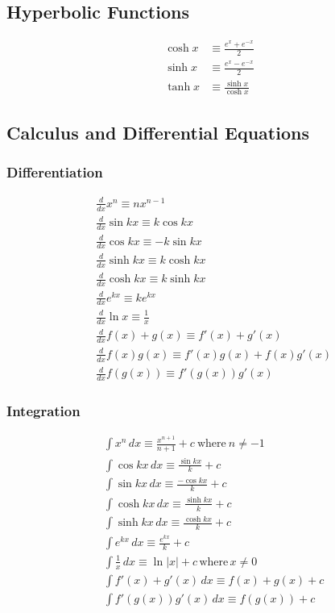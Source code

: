 \subsection{Hyperbolic Functions}
\begin{align*}
\cosh x &\equiv \frac{e^x+e^{-x}}{2}\\
\sinh x &\equiv \frac{e^x-e^{-x}}{2}\\
\tanh x &\equiv \frac{\sinh x}{\cosh x }
\end{align*}

\subsection{Calculus and Differential Equations}
\subsubsection{Differentiation}
\begin{align*}
    &\frac{d}{dx} x^n \equiv nx^{n-1}\\
    &\frac{d}{dx} \sin kx   \equiv k\cos kx\\
    &\frac{d}{dx} \cos kx   \equiv -k\sin kx\\
    &\frac{d}{dx} \sinh kx  \equiv k\cosh kx\\
    &\frac{d}{dx} \cosh kx  \equiv k\sinh kx \\
    &\frac{d}{dx} e^{kx}    \equiv ke^{kx}\\
    &\frac{d}{dx} \ln x     \equiv \frac{1}{x}\\
    &\frac{d}{dx} f(x)+g(x) \equiv f'(x)+g'(x)\\
    &\frac{d}{dx} f(x)g(x)  \equiv f'(x)g(x) + f(x)g'(x) \\
    &\frac{d}{dx} f(g(x))   \equiv f'(g(x))g'(x)
\end{align*}
\subsubsection{Integration}
\begin{align*}
    &\int x^n           \,dx \equiv \frac{x^{n+1}}{n+1} + c \ \text{where}\  n\neq -1 \\
    &\int \cos kx       \,dx \equiv \frac{\sin kx}{k} + c\\
    &\int \sin kx       \,dx \equiv \frac{-\cos kx}{k} + c\\
    &\int \cosh kx      \,dx \equiv \frac{\sinh kx}{k} + c\\
    &\int \sinh kx      \,dx \equiv \frac{\cosh kx}{k} + c\\
    &\int e^{kx}        \,dx \equiv \frac{e^{kx}}{k} + c\\
    &\int \frac{1}{x}   \,dx \equiv \ln|x|+c \,\text{where}\,x\neq 0\\
    &\int f'(x)+g'(x)   \,dx \equiv f(x)+g(x)+c\\
    &\int f'(g(x))g'(x) \,dx \equiv f(g(x))+c
\end{align*}

